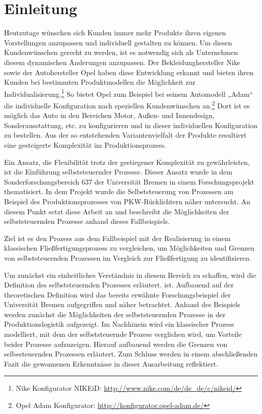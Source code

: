 \section{Einleitung}
\label{sec:Einleitung}
Heutzutage wünschen sich Kunden immer mehr Produkte ihren eigenen Vorstellungen
anzupassen und individuell gestalten zu können. Um diesen Kundenwünschen gerecht
zu werden, ist es notwendig sich als Unternehmen diesem dynamischen Änderungen
anzupassen.  Der Bekleidunghersteller Nike sowie der Autohersteller Opel haben
diese Entwicklung erkannt und bieten ihren Kunden bei bestimmten Produktmodellen
die Möglichkeit zur Individualisierung.\footnote{Nike Konfigurator NIKEiD:
\url{http://www.nike.com/de/de_de/c/nikeid/}} So bietet Opel zum Beispiel bei
seinem Automodell „Adam“ die individuelle Konfiguration nach speziellen
Kundenwünschen an.\footnote{Opel Adam Konfigurator:
\url{http://konfigurator.opel-adam.de/}} Dort ist es möglich das Auto in den
Bereichen Motor, Außen- und Innendesign, Sonderausstattung, etc. zu
konfigurieren und in dieser individuellen Konfiguration zu bestellen. Aus der
so entstehenden Variantenvielfalt der Produkte resultiert eine gesteigerte
Komplexität im Produktionsprozess.

Ein Ansatz, die Flexibilität trotz der gestiegener Komplexität zu gewährleisten,
ist die Einführung selbststeuernder Prozesse. Dieser Ansatz wurde in dem
Sonderforschungsbereich 637 der Universität Bremen in einem Forschungsprojekt
thematisiert. In dem Projekt wurde die Selbststeuerung von Prozessen am Beispiel
des Produktionsprozesses von PKW-Rücklichtern näher untersucht. An diesem Punkt
setzt diese Arbeit an und beschreibt die Möglichkeiten der selbststeuernden
Prozesse anhand dieses Fallbeispiels.

Ziel ist es den Prozess aus dem Fallbeispiel mit der Realisierung in einem
klassischen Fließfertigungsprozess zu vergleichen, um Möglichkeiten und Grenzen
von selbststeuernden Prozessen im Vergleich zur Fließfertigung zu
identifizieren.

Um zunächst ein einheitliches Verständnis in diesem Bereich zu schaffen, wird
die Definition des selbststeuernden Prozesses erläutert. ist. Aufbauend auf der
theoretischen Definition wird das bereits erwähnte Forschungsbeispiel der
Universität Bremen aufgegriffen und näher betrachtet. Anhand des Beispiels
werden zunächst die Möglichkeiten der selbststeuernden Prozesse in der
Produktionslogistik aufgezeigt. Im Nachhinein wird ein klassischer Prozess
modelliert, mit dem der selbststeuernde Prozess verglichen wird, um Vorteile
beider Prozesse aufzuzeigen. Hierauf aufbauend werden die Grenzen von
selbesteuernden Prozessen erläutert. Zum Schluss werden in einem abschließenden
Fazit die gewonnenen Erkenntnisse in dieser Ausarbeitung reflektiert.

\clearpage
